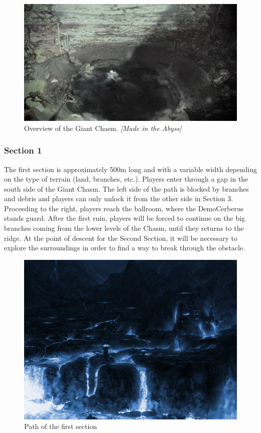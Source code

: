 \begin{figure}[H]
	\centering
	\includegraphics[width=0.8\linewidth]{images/visual_ref/15_giant_chasm/chasm_outside.jpg}
	\caption*{Overview of the Giant Chasm. \textit{[Made in the Abyss]}}
\end{figure}
\newpage


\subsubsection{Section 1}
The first section is approximately 500m long and with a variable width depending on the type of terrain (land, branches, etc.). Players enter through a gap in the south side of the Giant Chasm. The left side of the path is blocked by branches and debris and players can only unlock it from the other side in Section 3. Proceeding to the right, players reach the ballroom, where the DemoCerberus stands guard. After the first ruin, players will be forced to continue on the big branches coming from the lower levels of the Chasm, until they returns to the ridge. At the point of descent for the Second Section, it will be necessary to explore the surroundings in order to find a way to break through the obstacle.

\vspace*{0.3cm}
\begin{figure}[H]
	\centering
	\includegraphics[width=0.8\linewidth]{images/visual_ref/15_giant_chasm/chasm_section_1.png}
	\caption*{Path of the first section}
\end{figure}

